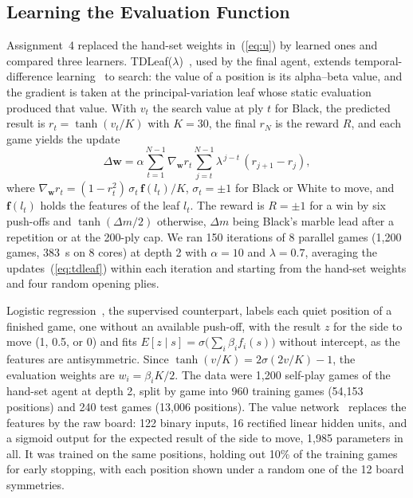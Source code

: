 \documentclass[conference,a4paper]{IEEEtran}
\begin{document}
\subsection{Learning the Evaluation Function}
Assignment~4 replaced the hand-set weights in~(\ref{eq:u}) by learned ones and compared three learners. TDLeaf($\lambda$)~\cite{baxter2000}, used by the final agent, extends temporal-difference learning~\cite{sutton1988,tesauro1995} to search: the value of a position is its alpha--beta value, and the gradient is taken at the principal-variation leaf whose static evaluation produced that value. With $v_t$ the search value at ply $t$ for Black, the predicted result is $r_t=\tanh(v_t/K)$ with $K=30$, the final $r_N$ is the reward $R$, and each game yields the update
\begin{equation}
\Delta\mathbf{w} = \alpha \sum_{t=1}^{N-1} \nabla_{\mathbf{w}} r_t \sum_{j=t}^{N-1} \lambda^{\,j-t}\,(r_{j+1}-r_j), \label{eq:tdleaf}
\end{equation}
where $\nabla_{\mathbf{w}} r_t=(1-r_t^{2})\,\sigma_t\,\mathbf{f}(l_t)/K$, $\sigma_t=\pm1$ for Black or White to move, and $\mathbf{f}(l_t)$ holds the features of the leaf $l_t$. The reward is $R=\pm1$ for a win by six push-offs and $\tanh(\Delta m/2)$ otherwise, $\Delta m$ being Black's marble lead after a repetition or at the 200-ply cap. We ran 150 iterations of 8 parallel games (1,200 games, 383~s on 8 cores) at depth 2 with $\alpha=10$ and $\lambda=0.7$, averaging the updates~(\ref{eq:tdleaf}) within each iteration and starting from the hand-set weights and four random opening plies.

Logistic regression~\cite{russell2021,buro1995}, the supervised counterpart, labels each quiet position of a finished game, one without an available push-off, with the result $z$ for the side to move (1, 0.5, or 0) and fits $E[z\mid s]=\sigma\bigl(\sum_i \beta_i f_i(s)\bigr)$ without intercept, as the features are antisymmetric. Since $\tanh(v/K)=2\sigma(2v/K)-1$, the evaluation weights are $w_i=\beta_i K/2$. The data were 1,200 self-play games of the hand-set agent at depth 2, split by game into 960 training games (54,153 positions) and 240 test games (13,006 positions). The value network~\cite{russell2021} replaces the features by the raw board: 122 binary inputs, 16 rectified linear hidden units, and a sigmoid output for the expected result of the side to move, 1,985 parameters in all. It was trained on the same positions, holding out 10\% of the training games for early stopping, with each position shown under a random one of the 12 board symmetries.
\end{document}
